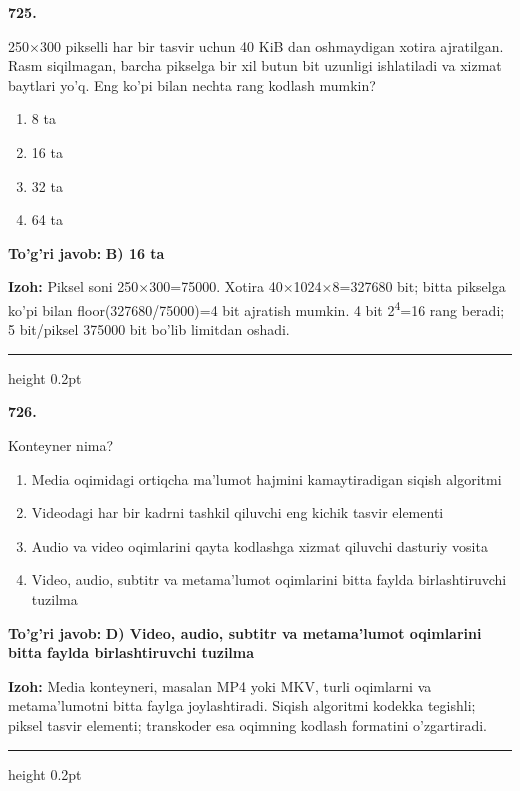 \documentclass[10pt,a4paper,oneside]{article}
\begin{document}
\noindent\textbf{\color{ink}725.}
\par
250\ensuremath{\times}300 pikselli har bir tasvir uchun 40 KiB dan oshmaydigan xotira ajratilgan. Rasm siqilmagan, barcha pikselga bir xil butun bit uzunligi ishlatiladi va xizmat baytlari yo'q. Eng ko'pi bilan nechta rang kodlash mumkin?
\begin{enumerate}[label=\Alph*),leftmargin=9mm]
\item 8 ta
\item 16 ta
\item 32 ta
\item 64 ta
\end{enumerate}
\begin{tcolorbox}[enhanced,breakable,colback=teal!4,colframe=teal!50!black,boxrule=0.5pt,arc=1.1mm,left=3mm,right=3mm,top=1.7mm,bottom=1.7mm,before skip=2mm,after skip=2mm]
\textbf{\color{teal}To'g'ri javob:} \textbf{B) 16 ta}
\par\smallskip
\textbf{Izoh:} Piksel soni 250\ensuremath{\times}300=75000. Xotira 40\ensuremath{\times}1024\ensuremath{\times}8=327680 bit; bitta pikselga ko'pi bilan floor(327680/75000)=4 bit ajratish mumkin. 4 bit 2\textsuperscript{4}=16 rang beradi; 5 bit/piksel 375000 bit bo'lib limitdan oshadi.
\end{tcolorbox}
\vspace{2mm}\hrule height 0.2pt \vspace{3mm}

\noindent\textbf{\color{ink}726.}
\par
Konteyner nima?
\begin{enumerate}[label=\Alph*),leftmargin=9mm]
\item Media oqimidagi ortiqcha ma'lumot hajmini kamaytiradigan siqish algoritmi
\item Videodagi har bir kadrni tashkil qiluvchi eng kichik tasvir elementi
\item Audio va video oqimlarini qayta kodlashga xizmat qiluvchi dasturiy vosita
\item Video, audio, subtitr va metama'lumot oqimlarini bitta faylda birlashtiruvchi tuzilma
\end{enumerate}
\begin{tcolorbox}[enhanced,breakable,colback=teal!4,colframe=teal!50!black,boxrule=0.5pt,arc=1.1mm,left=3mm,right=3mm,top=1.7mm,bottom=1.7mm,before skip=2mm,after skip=2mm]
\textbf{\color{teal}To'g'ri javob:} \textbf{D) Video, audio, subtitr va metama'lumot oqimlarini bitta faylda birlashtiruvchi tuzilma}
\par\smallskip
\textbf{Izoh:} Media konteyneri, masalan MP4 yoki MKV, turli oqimlarni va metama'lumotni bitta faylga joylashtiradi. Siqish algoritmi kodekka tegishli; piksel tasvir elementi; transkoder esa oqimning kodlash formatini o'zgartiradi.
\end{tcolorbox}
\vspace{2mm}\hrule height 0.2pt \vspace{3mm}
\end{document}
